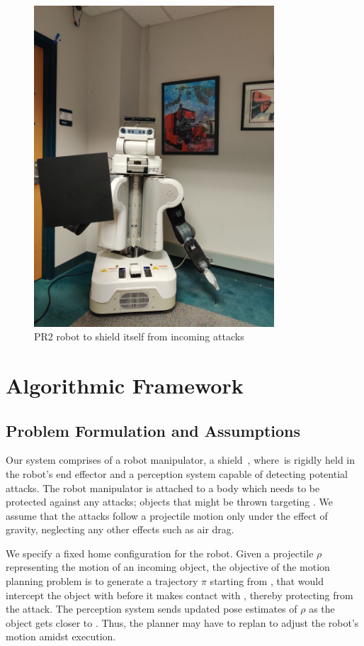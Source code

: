 \documentclass[a4paper]{report}
\begin{document}
\begin{figure}[H]
\centering
 \includegraphics[trim={0 0 2cm 10cm},clip, width=0.8\textwidth]{shield_cover}
\caption{PR2 robot to shield itself from incoming attacks}
\label{fig:shield_pr2}
\end{figure}

\section{Algorithmic Framework}
\subsection{Problem Formulation and Assumptions}
Our system comprises of a robot manipulator, a shield~\calS, where~\calS is rigidly held in the robot's end effector and a perception system capable of detecting potential attacks. The robot manipulator is attached to a body \calB which needs to be protected against any attacks; objects that might be thrown targeting \calB. We assume that the attacks follow a projectile motion only under the effect of gravity, neglecting any other effects such as air drag.

We specify a fixed home configuration \Shome for the robot. Given a projectile $\rho$ representing the motion of an incoming object, the objective of the motion planning problem is to generate a trajectory $\pi$ starting from \Shome, that would intercept the object with \calS before it makes contact with \calB, thereby protecting \calB from the attack.
%
The perception system sends updated pose estimates of $\rho$ as the object gets closer to \calB. Thus, the planner may have to replan to adjust the robot's motion amidst execution.
\end{document}
